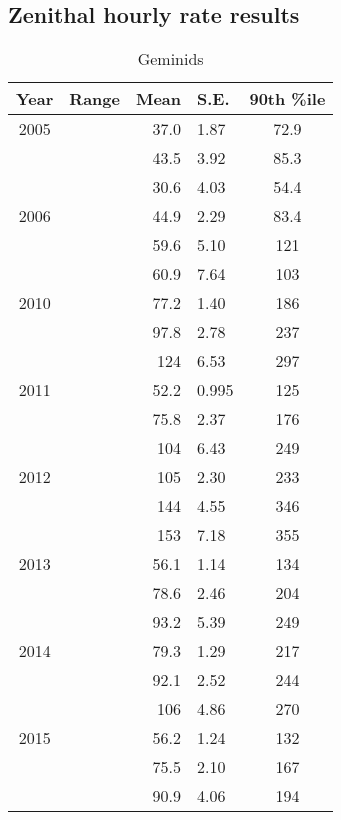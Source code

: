 \documentclass[a4paper,12pt,twocolumn]{report}
\begin{document}
\begin{appendices}
\chapter{Zenithal hourly rate results}
\label{app:zhr}
\begin{table*}
	\centering
	\begin{tabular}{|c|c|r@{ \,$\pm$\, }l|c|}
		\hline 
		Year & Range & Mean & S.E. & 90th \%ile\\ 
		\hline 
		2005 & & 37.0 & 1.87 & 72.9   \\ 
		\hline 
		& & 43.5 & 3.92 & 85.3   \\ 
		\hline 
		& & 30.6 & 4.03 & 54.4   \\ 
		\hline 
		2006 & & 44.9 & 2.29 & 83.4   \\ 
		\hline 
		& &	 59.6 & 5.10 & 121   \\ 
		\hline 
		& & 60.9 & 7.64 & 103   \\ 
		\hline 
		2010 & & 77.2 & 1.40 & 186   \\ 
		\hline 
		& & 97.8 & 2.78 & 237   \\ 
		\hline 
		& &	124 & 6.53 & 297   \\ 
		\hline 
		2011 & & 52.2 & 0.995 & 125   \\ 
		\hline 
		& & 75.8 & 2.37 & 176   \\ 
		\hline 
		& & 104 & 6.43 & 249   \\ 
		\hline 
		2012 & & 105 & 2.30 & 233   \\ 
		\hline
		& & 144 & 4.55 & 346   \\ 
		\hline 
		& & 153 & 7.18 & 355   \\ 
		\hline 
		2013 & & 56.1 & 1.14 & 134   \\ 
		\hline 
		& & 78.6 & 2.46 & 204   \\ 
		\hline 
		& & 93.2 & 5.39 & 249   \\ 
		\hline 
		2014 & & 79.3 & 1.29 & 217   \\ 
		\hline 
		& & 92.1 & 2.52 & 244   \\ 
		\hline 
		& & 106 & 4.86 & 270   \\ 
		\hline 
		2015 & & 56.2 & 1.24 & 132   \\ 
		\hline 
		& & 75.5 & 2.10 & 167   \\ 
		\hline 
		& & 90.9 & 4.06 & 194   \\ 
		\hline 
	\end{tabular} 
\caption{Geminids}
\end{table*}


\end{appendices}
\end{document}
